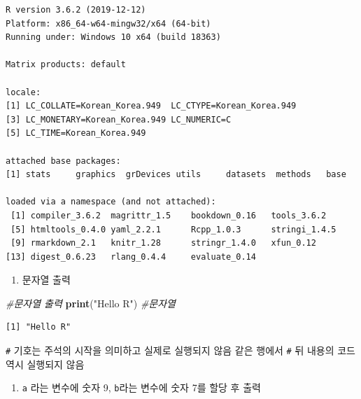 \documentclass[
  11pt,
]{krantz}
\makeatletter
\newenvironment{Shaded}{\begin{snugshade}}{\end{snugshade}}
\newcommand{\CommentTok}[1]{\textcolor[rgb]{0.37,0.37,0.37}{\textit{#1}}}
\newcommand{\KeywordTok}[1]{\textcolor[rgb]{0.27,0.27,0.27}{\textbf{#1}}}
\newcommand{\NormalTok}[1]{#1}
\newcommand{\StringTok}[1]{\textcolor[rgb]{0.5,0.5,0.5}{#1}}
\providecommand{\tightlist}{%
  \setlength{\itemsep}{0pt}\setlength{\parskip}{0pt}}
\newenvironment{kframe}{%
\medskip{}
\setlength{\fboxsep}{.8em}
 \def\at@end@of@kframe{}%
 \ifinner\ifhmode%
  \def\at@end@of@kframe{\end{minipage}}%
  \begin{minipage}{\columnwidth}%
 \fi\fi%
 \def\FrameCommand##1{\hskip\@totalleftmargin \hskip-\fboxsep
 \colorbox{shadecolor}{##1}\hskip-\fboxsep
     \hskip-\linewidth \hskip-\@totalleftmargin \hskip\columnwidth}%
 \MakeFramed {\advance\hsize-\width
   \@totalleftmargin\z@ \linewidth\hsize
   \@setminipage}}%
 {\par\unskip\endMakeFramed%
 \at@end@of@kframe}
\renewenvironment{quote}{\begin{kframe}}{\end{kframe}}
\makeatother
\begin{document}
\begin{verbatim}
R version 3.6.2 (2019-12-12)
Platform: x86_64-w64-mingw32/x64 (64-bit)
Running under: Windows 10 x64 (build 18363)

Matrix products: default

locale:
[1] LC_COLLATE=Korean_Korea.949  LC_CTYPE=Korean_Korea.949   
[3] LC_MONETARY=Korean_Korea.949 LC_NUMERIC=C                
[5] LC_TIME=Korean_Korea.949    

attached base packages:
[1] stats     graphics  grDevices utils     datasets  methods   base     

loaded via a namespace (and not attached):
 [1] compiler_3.6.2  magrittr_1.5    bookdown_0.16   tools_3.6.2    
 [5] htmltools_0.4.0 yaml_2.2.1      Rcpp_1.0.3      stringi_1.4.5  
 [9] rmarkdown_2.1   knitr_1.28      stringr_1.4.0   xfun_0.12      
[13] digest_0.6.23   rlang_0.4.4     evaluate_0.14  
\end{verbatim}

\normalsize

\begin{enumerate}
\def\labelenumi{\arabic{enumi}.}
\setcounter{enumi}{1}
\tightlist
\item
  문자열 출력
\end{enumerate}

\footnotesize

\begin{Shaded}
\begin{Highlighting}[]
\CommentTok{#문자열 출력}
\KeywordTok{print}\NormalTok{(}\StringTok{"Hello R"}\NormalTok{) }\CommentTok{#문자열}
\end{Highlighting}
\end{Shaded}

\begin{verbatim}
[1] "Hello R"
\end{verbatim}

\normalsize

\begin{quote}
\texttt{\#} 기호는 주석의 시작을 의미하고 실제로 실행되지 않음 같은 행에서 \texttt{\#} 뒤 내용의 코드 역시 실행되지 않음
\end{quote}

\begin{enumerate}
\def\labelenumi{\arabic{enumi}.}
\setcounter{enumi}{2}
\tightlist
\item
  \texttt{a} 라는 변수에 숫자 9, \texttt{b}라는 변수에 숫자 7를 할당 후 출력
\end{enumerate}
\end{document}
